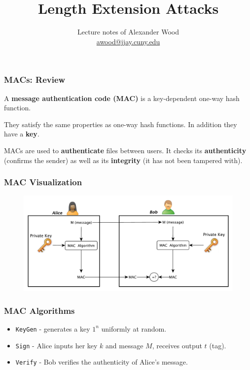 \documentclass{beamer}
\title[LEA]{Length Extension Attacks}
\author
{Lecture notes of Alexander Wood \\ \scriptsize \href{mailto:awood@jjay.cuny.edu}{awood@jjay.cuny.edu}}
\institute[JJay]{John Jay College of Criminal Justice}
\date{}
\newcommand{\<}{\langle}
\renewcommand{\>}{\rangle}
\begin{document}

\begin{frame}
  \titlepage
\end{frame}


\begin{frame}
\frametitle{MACs: Review}

A \textbf{message authentication code (MAC)} is a key-dependent one-way hash function.
\newline

They satisfy the same properties as one-way hash functions. In addition they have a \textbf{key}.\newline

MACs are used to \textbf{authenticate} files between users. It checks its \textbf{authenticity} (confirms the sender) as well as its \textbf{integrity} (it has not been tampered with). \newline
\end{frame}


\begin{frame}
\frametitle{MAC Visualization}

\begin{figure}
\centering
\includegraphics[scale=.45]{IMG/MAC}
\end{figure}
\end{frame}

\begin{frame}[fragile]
\frametitle{MAC Algorithms}

\begin{itemize}
\item \verb|KeyGen| - generates a key $1^n$ uniformly at random.
\item \verb|Sign| - Alice inputs her key $k$ and message $M$, receives output $t$ (tag).
\item \verb|Verify| - Bob verifies the authenticity of Alice's message.
\end{itemize}
\end{frame}
\end{document}
